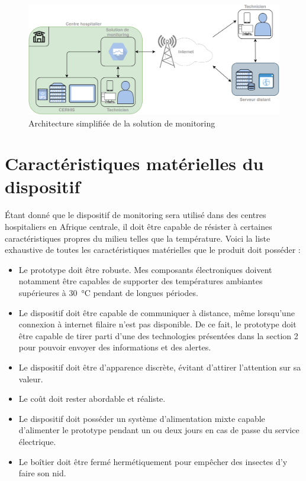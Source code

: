 \begin{figure}[ht!]
  \centering
  \includegraphics[width=\textwidth]{img/cahier_des_charges/baseline_archi.png}
  \caption{Architecture simplifiée de la solution de monitoring}
  \label{fig:mon_archi_simple}
\end{figure}

\section{Caractéristiques matérielles du dispositif}
\label{sec:cahier_proto}

Étant donné que le dispositif de monitoring sera utilisé dans des centres hospitaliers en Afrique centrale, il doit être capable de résister à certaines caractéristiques propres du milieu telles que la température. Voici la liste exhaustive de toutes les caractéristiques matérielles que le produit doit posséder :

\begin{itemize}
  \item Le prototype doit être robuste. Mes composants électroniques doivent notamment être capables de supporter des températures ambiantes supérieures à \SI{30}{\celsius} pendant de longues périodes. \cite{temperature_kinshasa}

  \item Le dispositif doit être capable de communiquer à distance, même lorsqu’une connexion à internet filaire n’est pas disponible. De ce fait, le prototype doit être capable de tirer parti d’une des technologies présentées dans la section 2 pour pouvoir envoyer des informations et des alertes.

  \item Le dispositif doit être d’apparence discrète, évitant d’attirer l’attention sur sa valeur.

  \item Le coût doit rester abordable et réaliste.

  \item Le dispositif doit posséder un système d’alimentation mixte capable d’alimenter le prototype pendant un ou deux jours en cas de passe du service électrique.

  \item Le boîtier doit être fermé hermétiquement pour empêcher des insectes d’y faire son nid.
\end{itemize}



